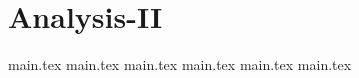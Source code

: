 \part{Analysis-II}\label{ii:part}

{main.tex}
{main.tex}
{main.tex}
{main.tex}
{main.tex}
{main.tex}
